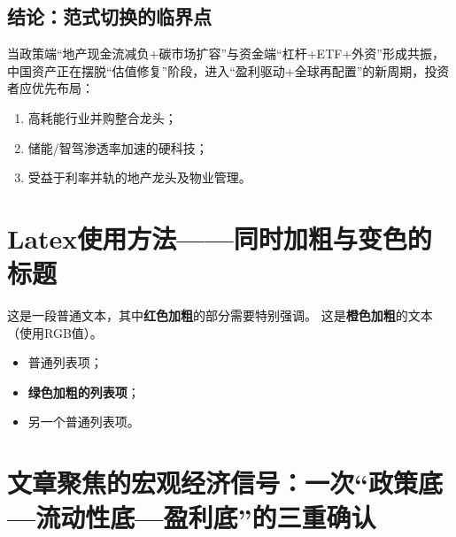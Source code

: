 \subsection{结论：范式切换的临界点}
当政策端“地产现金流减负+碳市场扩容”与资金端“杠杆+ETF+外资”形成共振，中国资产正在摆脱“估值修复”阶段，进入“盈利驱动+全球再配置”的新周期，投资者应优先布局：
\begin{enumerate}[leftmargin=*, nosep]
    \item 高耗能行业并购整合龙头；
    \item 储能/智驾渗透率加速的硬科技；
    \item 受益于利率并轨的地产龙头及物业管理。
\end{enumerate}

 \section{\color{blue}\textbf{Latex使用方法——同时加粗与变色的标题}}
    
    这是一段普通文本，其中{\color{red}\textbf{红色加粗}}的部分需要特别强调。  
    这是{\color[RGB]{255,165,0}\textbf{橙色加粗}}的文本（使用RGB值）。
    
    \begin{itemize}
        \item 普通列表项；
        \item {\color{green}\textbf{绿色加粗的列表项}}；
        \item 另一个普通列表项。
    \end{itemize}


\section{文章聚焦的宏观经济信号：一次“政策底—流动性底—盈利底”的三重确认}


